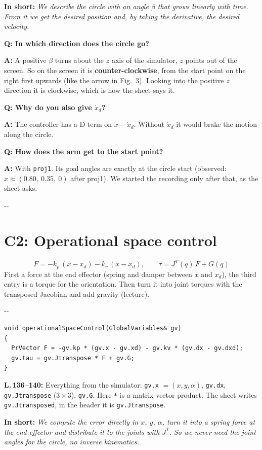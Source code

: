 \documentclass[10pt,a4paper]{article}
\makeatletter
\newcommand{\secneed}[1]{\par\penalty\@M\begingroup\setlength{\dimen@}{#1}\dimen@ii\pagegoal
  \advance\dimen@ii-\pagetotal\ifdim\dimen@>\dimen@ii\ifdim\dimen@ii>\z@\vfil\fi\penalty-\@M\fi\endgroup}
\let\oldsection\section
\renewcommand{\section}{\secneed{9\baselineskip}\oldsection}
\newcommand{\frage}[2]{\textbf{Q: #1}\par\nopagebreak\vspace{1pt}\textbf{A:} #2\par\vspace{5pt}}
\newcommand{\sagen}[1]{\textbf{In short:} \emph{#1}\par}
\newcommand{\code}[1]{\texttt{#1}}
\makeatother
\begin{document}
\sagen{We describe the circle with an angle $\beta$ that grows linearly with time. From it we get the desired position
and, by taking the derivative, the desired velocity.}

\begin{fragen}
\frage{In which direction does the circle go?}
{A positive $\beta$ turns about the $z$ axis of the simulator, $z$ points out of the screen. So on the screen it is
\textbf{counter-clockwise}, from the start point on the right first upwards (like the arrow in Fig.~3). Looking into the
positive $z$ direction it is clockwise, which is how the sheet says it.}
\frage{Why do you also give $\dot x_d$?}
{The controller has a D term on $\dot x - \dot x_d$. Without $\dot x_d$ it would brake the motion along the circle.}
\frage{How does the arm get to the start point?}
{With \code{proj1}. Its goal angles are exactly at the circle start (observed: $x \approx (0.80,\ 0.35,\ 0)$ after
proj1). We started the recording only after that, as the sheet asks.}
\end{fragen}

\section{C2: Operational space control}

\[
  F = -k_p\,(x - x_d) - k_v\,(\dot x - \dot x_d), \qquad \tau = J^T(q)\,F + G(q)
\]
First a force at the end effector (spring and damper between $x$ and $x_d$), the third entry is a torque for the
orientation. Then turn it into joint torques with the transposed Jacobian and add gravity (lecture).

\secneed{6\baselineskip}
\begin{lstlisting}[firstnumber=136]
void operationalSpaceControl(GlobalVariables& gv)
{
  PrVector F = -gv.kp * (gv.x - gv.xd) - gv.kv * (gv.dx - gv.dxd);
  gv.tau = gv.Jtranspose * F + gv.G;
}
\end{lstlisting}
\textbf{L.\,136--140:} Everything from the simulator: \code{gv.x} $= (x, y, \alpha)$, \code{gv.dx}, \code{gv.Jtranspose}
($3 \times 3$), \code{gv.G}. Here \code{*} is a matrix-vector product. The sheet writes \code{gv.Jtransposed}, in the
header it is \code{gv.Jtranspose}.

\sagen{We compute the error directly in $x$, $y$, $\alpha$, turn it into a spring force at the end effector and
distribute it to the joints with $J^T$. So we never need the joint angles for the circle, no inverse kinematics.}
\end{document}
